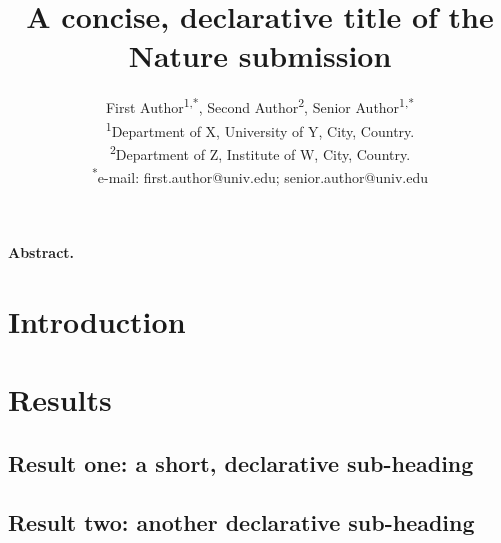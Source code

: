 \documentclass[11pt,a4paper]{article}
\title{\textbf{A concise, declarative title of the Nature submission}}
\author{First Author\textsuperscript{1,*}, Second Author\textsuperscript{2}, Senior Author\textsuperscript{1,*}\\
\textsuperscript{1}Department of X, University of Y, City, Country.\\
\textsuperscript{2}Department of Z, Institute of W, City, Country.\\
\textsuperscript{*}e-mail: first.author@univ.edu; senior.author@univ.edu}
\date{}
\begin{document}
\linenumbers                     %

\maketitle

\noindent\textbf{Abstract.} %

\section*{Introduction}

\section*{Results}

\subsection*{Result one: a short, declarative sub-heading}

\subsection*{Result two: another declarative sub-heading}
\end{document}
